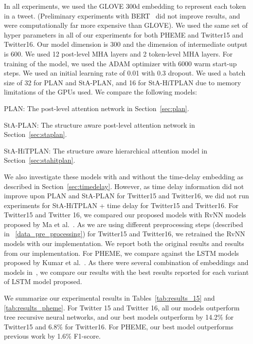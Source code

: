\documentclass[letterpaper]{article} %
\begin{document}
In all experiments, we used the GLOVE 300d \cite{pennington2014glove} embedding to represent each token in a tweet. (Preliminary experiments with BERT~\cite{devlin2018bert} did not improve results, and were computationally far more expensive than GLOVE). We used the same set of hyper parameters in all of our experiments for both PHEME and Twitter15 and Twitter16. Our model dimension is 300 and the dimension of intermediate output is 600. We used 12 post-level MHA layers and 2 token-level MHA layers. For training of the model, we used the ADAM optimizer with 6000 warm start-up steps. We used an initial learning rate of 0.01 with 0.3 dropout. We used a batch size of 32 for PLAN and StA-PLAN, and 16 for StA-HiTPLAN due to memory limitations of the GPUs used. We compare the following models:
\begin{itemize*}
\item PLAN: The post-level attention network in Section~\ref{sec:plan}.
\item StA-PLAN: The structure aware post-level attention network in Section~\ref{sec:staplan}.
\item StA-HiTPLAN: The structure aware hierarchical attention model in Section~\ref{sec:stahitplan}.
\end{itemize*}
We also investigate these models with and without the time-delay embedding as described in Section~\ref{sec:timedelay}. However, as time delay information did not improve upon PLAN and StA-PLAN for Twitter15 and Twitter16, we did not run experiments for StA-HiTPLAN + time delay for Twitter15 and Twitter16. 
For Twitter15 and Twitter 16, we compared our proposed models with RvNN models proposed by Ma et al.~. As we are using different preprocessing steps (described in ~\ref{data_pre_processing}) for Twitter15 and Twitter16, we retrained the RvNN models with our implementation. We report both the original results and results from our implementation. For PHEME, we compare against the LSTM models proposed by Kumar et al.~. As there were several combination of embeddings and models in~\cite{kumar19}, we compare our results with the best results reported for each variant of LSTM model proposed.

We summarize our experimental results in Tables~\ref{tab:results_15} and \ref{tab:results_pheme}. 
For Twitter 15 and Twitter 16, all our models outperform tree recursive neural networks, and our best models outperform by 14.2\% for Twitter15 and 6.8\% for Twitter16. For PHEME, our best model outperforms previous work by 1.6\% F1-score. 
\end{document}
